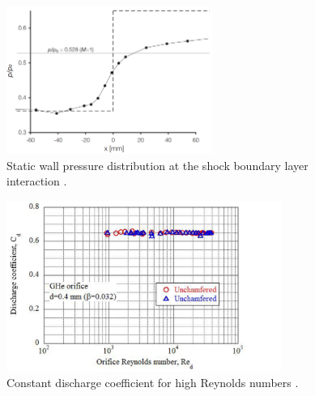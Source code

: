 \documentclass{article}
\begin{document}
\begin{figure}[H]
    \centering
    \includegraphics[width=0.6\textwidth]{SBLI_pressure_smearing.png}
    \caption{Static wall pressure distribution at the shock boundary layer interaction \cite{babinsky_delery:2011}.}
    \label{fig:SBLI_pressure_smearing}
\end{figure}

\begin{figure}[H]
    \centering
    \includegraphics[width=0.8\textwidth]{Graham_K_Webster_const_Cd_Re.png}
    \caption{Constant discharge coefficient for high Reynolds numbers \cite{Graham_K_Webster:2019}.}
    \label{fig:const_Cd_Re}
\end{figure}

\fi



\end{document}
